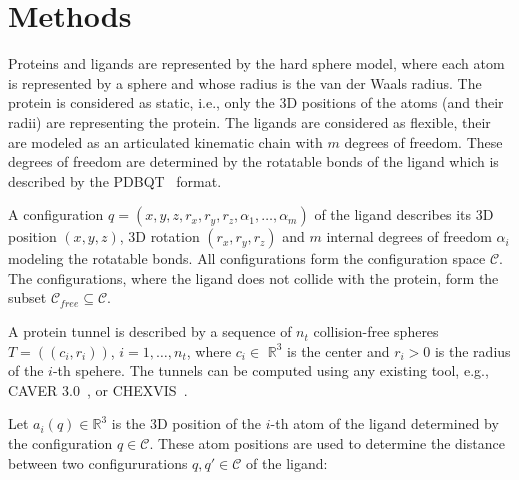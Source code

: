 \documentclass{bmcart}
\def\C{\mathcal{C}}
\def\CF{\mathcal{C}_{free}}
\def\R{\mathbb{R}}
\begin{document}
%



\section*{Methods}


Proteins and ligands are represented by the hard sphere model, where each atom is represented by a sphere and whose radius 
is the van der Waals radius.
The protein is considered as static, i.e., only the 3D positions of the atoms (and their radii) are representing the protein.
The ligands are considered as flexible, their are modeled as an articulated kinematic chain with $m$ degrees of freedom.
These degrees of freedom are determined by the rotatable bonds of the ligand which is described by the PDBQT~\cite{pdbqt} format.

A configuration $q=(x,y,z,r_x,r_y,r_z, \alpha_1,\ldots,\alpha_m)$ of the ligand describes its 3D 
position $(x,y,z)$, 3D rotation $(r_x,r_y,r_z)$ and $m$ internal degrees of freedom $\alpha_i$ modeling  the rotatable bonds.
All configurations form the configuration space $\C$.
The configurations, where the ligand does not collide with the protein, form the subset $\CF \subseteq \C$.


A protein tunnel is described by a sequence of $n_t$ collision-free spheres $T=( (c_i, r_i) )$, $i=1,\ldots,n_t$, 
where $c_i \in$ $\mathbb{R}^3$ is the center and $r_i > 0$ is the radius of the $i$-th spehere.
The tunnels can be computed using any existing tool, e.g., CAVER 3.0~\cite{caver3}, or CHEXVIS~\cite{masood2015chexvis}.

Let $a_i(q) \in \R^3$ is the 3D position of the $i$-th atom of the ligand determined by the configuration $q \in \C$.
These atom positions are used to determine the distance between two  configururations $q,q' \in \C$ of the ligand:
\end{document}
